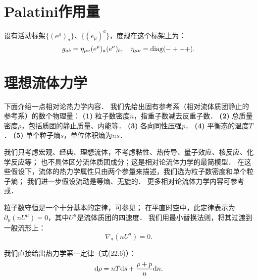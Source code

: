 \section{Palatini作用量}\label{chlh:sec_Palatini}

设有活动标架$\{(e^\mu)_a\}$、$\{(e_\mu)^a\}$，度规在这个标架上为：
\begin{equation}
	g_{ab} = \eta_{\mu\nu} (e^\mu)_a (e^\nu)_b,\quad
	\eta_{\mu\nu} = {\rm diag}(-+++) .
\end{equation}


\section{理想流体力学}\label{chlh:perfect-fluid}


下面介绍一点相对论热力学内容\cite[\S 22.2]{mtw1973}．
我们先给出固有参考系（相对流体质团静止的参考系）的数个物理量：
{\bfseries (1)} 粒子数密度$n$，指重子数减去反重子数．
{\bfseries (2)} 总质量密度$\rho$，包括质团的静止质量、内能等．
{\bfseries (3)} 各向同性压强$p$．
{\bfseries (4)} 平衡态的温度$T$．
{\bfseries (5)} 单个粒子熵$s$，单位体积熵为$n s$．


我们只考虑宏观、经典、理想流体，不考虑粘性、热传导、量子效应、核反应、化学反应等；
也不具体区分流体质团成分；这是相对论流体力学的最简模型．
在这些假设下，流体的热力学属性只由两个参量来描述，我们选为粒子数密度和单个粒子熵；
我们进一步假设流动是等熵、无旋的．
更多相对论流体力学内容可参考\parencite[Ch.15]{landau_6-fluid}或\parencite[\S 2.10]{weinberg_grav-1972}．


{\kaishu 粒子数守恒}是一个十分基本的定律，可参见\parencite[\S 3]{landau_5-statistical}；
在平直时空中，此定律表示为$\partial_\mu (n U^\mu)=0$，其中$U^\mu$是流体质团的四速度．
我们用最小替换法则，将其过渡到一般流形上：
\begin{equation}\label{chlh:eqn_particle-cons}
    \nabla_a (n U^a) = 0.
\end{equation}


我们直接给出热力学第一定律（\parencite[\S 22.2]{mtw1973}式(22.6)）：
\begin{equation}\label{chlh:eqn_1TDL}
    {\rm d}\rho = n T {\rm d}s +\frac{\rho+p}{n} {\rm d}n .
\end{equation}



